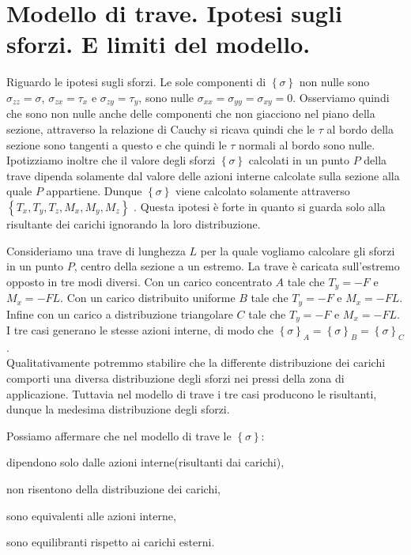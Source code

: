 \section{Modello di trave. Ipotesi sugli sforzi. E limiti del modello.}

Riguardo le ipotesi sugli sforzi. Le sole componenti di $\left\{\sigma\right\}$ non nulle sono $\sigma_{zz} = \sigma$, $\sigma_{zx} = \tau_x$ e $\sigma_{zy} = \tau_y$, sono nulle $\sigma_{xx} = \sigma_{yy}=\sigma_{xy}=0$. Osserviamo quindi che sono non nulle anche delle componenti che non giacciono nel piano della sezione, attraverso la relazione di Cauchy si ricava quindi che le $ \tau$ al bordo della sezione sono tangenti a questo e che quindi le $\tau$ normali al bordo sono nulle.\\
Ipotizziamo inoltre che il valore degli sforzi $\left\{\sigma\right\}$  calcolati in un punto $P$ della trave dipenda solamente dal valore delle azioni interne calcolate sulla sezione alla quale $P$ appartiene. Dunque $\left\{\sigma\right\}$  viene calcolato solamente attraverso $\left\{ T_x, T_y,T_z, M_x, M_y,M_z\right\}$ . Questa ipotesi è forte in quanto si guarda solo alla risultante dei carichi ignorando la loro distribuzione.\\

\begin{esempioBox}
    Consideriamo una trave di lunghezza $L$ per la quale vogliamo calcolare gli sforzi in un punto $P$, centro della sezione a un estremo. La trave è caricata sull'estremo opposto in tre modi diversi. Con un carico concentrato $A$ tale che $T_y = -F$  e $M_x = -FL$. Con un carico distribuito uniforme $B$ tale che $T_y = -F$  e $M_x = -FL$. Infine con un carico a distribuzione triangolare $C$ tale che $T_y = -F$  e $M_x = -FL$.
    I tre casi generano le stesse azioni interne, di modo che $\left\{\sigma\right\}_A =\left\{\sigma\right\}_B= \left\{\sigma\right\}_C $ .\\
    Qualitativamente potremmo stabilire che la differente distribuzione dei carichi comporti una diversa distribuzione degli sforzi nei pressi della zona di applicazione. Tuttavia nel modello di trave i tre casi producono le risultanti, dunque la medesima distribuzione degli sforzi.
\end{esempioBox}
 Possiamo affermare che nel modello di trave le $\left\{\sigma\right\}$:
 \begin{compactitem}
     \item dipendono solo dalle azioni interne(risultanti dai carichi),\\
     \item non risentono della distribuzione dei carichi,\\
     \item sono equivalenti alle azioni interne,\\
     \item sono equilibranti rispetto ai carichi esterni.
 \end{compactitem}
 
